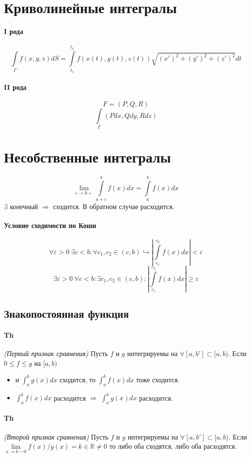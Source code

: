 \documentclass{article}
\newcommand{\R}{\mathbb{R}}
\begin{document}
\section{Криволинейные интегралы}
\paragraph*{I рода}
$$\int\limits_\Gamma f(x,y,z)dS = \int\limits_{t_1}^{t_2}f(x(t),y(t), z(t))\sqrt{(x')^2 + (y')^2 + (z')^2}dt$$
\paragraph*{II рода}
$$ F = (P, Q ,R) $$
$$ \int\limits_\Gamma (P dx, Q dy, R dz) $$

\newpage
\section{Несобственные интегралы}
$$ \lim\limits_{\varepsilon \to 0+}\int\limits_{a+\varepsilon}^b f(x) dx = \int\limits_a^bf(x)dx $$
$\exists$ конечный $\Rightarrow$ сходится. В обратном случае расходится.
\paragraph*{Условие сходимости по Коши}
$$\forall \varepsilon > 0 \; \exists c < b: \forall c_1, c_2 \in(c,b) \hookrightarrow \left| \int\limits_{c_1}^{c_2}f(x)dx \right| < \varepsilon$$
$$\exists \varepsilon > 0 \; \forall c < b: \exists c_1, c_2 \in(c,b) : \left| \int\limits_{c_1}^{c_2}f(x)dx \right| \geq \varepsilon$$
\subsection{Знакопостоянная функция}
\paragraph*{Th} \textit{(Первый признак сравнения)} Пусть $f$ и $g$ интегрируемы на $\forall [a,b']\subset [a,b)$. Если $0 \leq f\leq g$ на $ [a,b) $
\begin{itemize}
    \item и $\int_a^b g(x)dx $ сходится, то $\int_a^b f(x)dx $ тоже сходится.
    \item $\int_a^b f(x)dx $ расходится $\Rightarrow$ $\int_a^b g(x)dx $ расходится.
\end{itemize}


\paragraph*{Th} \textit{(Второй признак сравнения)} Пусть $f$ и $g$ интегрируемы на $\forall [a,b']\subset [a,b)$. Если $ \lim\limits_{x\to b-0}{f(x)}/{g(x)} = k \in \R \neq 0$ то либо оба сходятся, либо оба расходятся.
\end{document}

